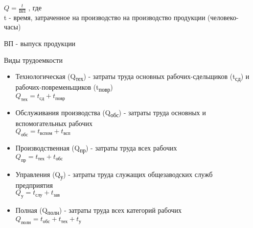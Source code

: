 \documentclass[11pt]{article}
\begin{document}
$Q = \frac{t}{\text{ВП}}$
, где \\[0pt]

t - время, затраченное на производство на производство продукции (человеко-часы)

ВП - выпуск продукции

\begin{center}
Виды трудоемкости
\end{center}

\begin{itemize}
\item Технологическая (Q\textsubscript{тех}) - затраты труда основных рабочих-сдельщиков (t\textsubscript{сд}) и рабочих-повременьщиков (t\textsubscript{повр}) \\[0pt]

$Q_{\text{тех}} = t_{\text{сд}} + t_{\text{повр}}$
\end{itemize}


\begin{itemize}
\item Обслуживания производства (Q\textsubscript{обс}) - затраты труда основных и вспомогательных рабочих \\[0pt]

$Q_{\text{обс}} = t_{\text{вспом}} + t_{\text{всп}}$

\item Производственная (Q\textsubscript{пр}) - затраты труда всех рабочих \\[0pt]

$Q_{\text{пр}} = t_{\text{тех}} + t_{\text{обс}}$

\item Управления (Q\textsubscript{у}) - затраты труда служащих общезаводских служб предприятия \\[0pt]

$Q_{\text{у}} = t_{\text{слу}} + t_{\text{зав}}$
\end{itemize}


\begin{itemize}
\item Полная (Q\textsubscript{полн}) - затраты труда всех категорий рабочих \\[0pt]

$Q_{\text{полн}} = t_{\text{обс}} + t_{\text{тех}} + t_{\text{у}}$
\end{itemize}
\end{document}
